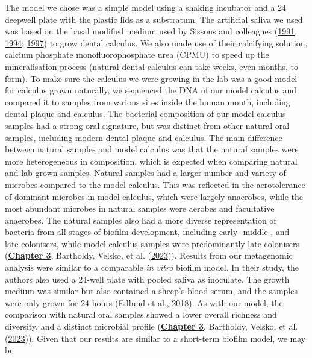\documentclass[
  b5paper,
]{book}
\begin{document}
The model we chose was a simple model using a shaking incubator and a 24
deepwell plate with the plastic lids as a substratum. The artificial
saliva we used was based on the basal modified medium used by Sissons
and colleagues
(\protect\hyperlink{ref-sissonsMultistationPlaque1991}{1991},
\protect\hyperlink{ref-sissonsPHResponse1994}{1994};
\protect\hyperlink{ref-sissonsArtificialPlaque1997}{1997}) to grow
dental calculus. We also made use of their calcifying solution, calcium
phosphate monofluorophosphate urea (CPMU) to speed up the mineralisation
process (natural dental calculus can take weeks, even months, to form).
To make sure the calculus we were growing in the lab was a good model
for calculus grown naturally, we sequenced the DNA of our model calculus
and compared it to samples from various sites inside the human mouth,
including dental plaque and calculus. The bacterial composition of our
model calculus samples had a strong oral signature, but was distinct
from other natural oral samples, including modern dental plaque and
calculus. The main difference between natural samples and model calculus
was that the natural samples were more heterogeneous in composition,
which is expected when comparing natural and lab-grown samples. Natural
samples had a larger number and variety of microbes compared to the
model calculus. This was reflected in the aerotolerance of dominant
microbes in model calculus, which were largely anaerobes, while the most
abundant microbes in natural samples were aerobes and facultative
anaerobes. The natural samples also had a more diverse representation of
bacteria from all stages of biofilm development, including early-
middle-, and late-colonisers, while model calculus samples were
predominantly late-colonisers
(\protect\hyperlink{byoc-valid}{\textbf{Chapter 3}}, Bartholdy, Velsko,
et al. (\protect\hyperlink{ref-bartholdyAssessingValidity2023}{2023})).
Results from our metagenomic analysis were similar to a comparable
\emph{in vitro} biofilm model. In their study, the authors also used a
24-well plate with pooled saliva as inoculate. The growth medium was
similar but also contained a sheep's-blood serum, and the samples were
only grown for 24 hours
(\protect\hyperlink{ref-edlundUncoveringComplex2018}{Edlund et al.,
2018}). As with our model, the comparison with natural oral samples
showed a lower overall richness and diversity, and a distinct microbial
profile (\protect\hyperlink{byoc-valid}{\textbf{Chapter 3}}, Bartholdy,
Velsko, et al.
(\protect\hyperlink{ref-bartholdyAssessingValidity2023}{2023})). Given
that our results are similar to a short-term biofilm model, we may be
\end{document}
